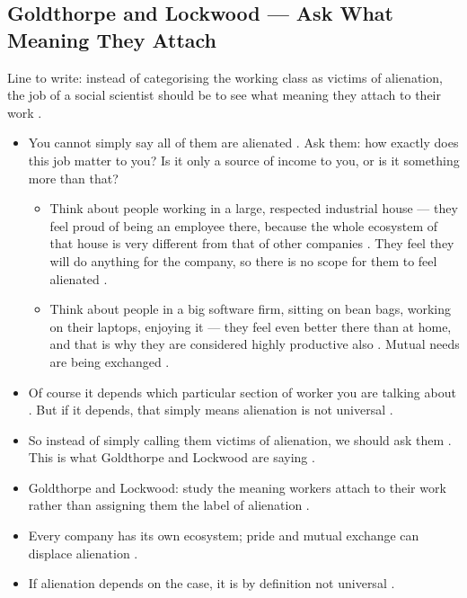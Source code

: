 \subsection{Goldthorpe and Lockwood --- Ask What Meaning They Attach}
\begin{KeyConcept}
Line to write: instead of categorising the working class as victims of alienation, the job of a social scientist should be to see what meaning they attach to their work .
\end{KeyConcept}

\begin{itemize}
    \item You cannot simply say all of them are alienated . Ask them: how exactly does this job matter to you? Is it only a source of income to you, or is it something more than that? 
    \begin{itemize}
        \item Think about people working in a large, respected industrial house --- they feel proud of being an employee there, because the whole ecosystem of that house is very different from that of other companies . They feel they will do anything for the company, so there is no scope for them to feel alienated .
        \item Think about people in a big software firm, sitting on bean bags, working on their laptops, enjoying it --- they feel even better there than at home, and that is why they are considered highly productive also . Mutual needs are being exchanged .
    \end{itemize}
    \item Of course it depends which particular section of worker you are talking about . But if it depends, that simply means alienation is not universal .
    \item So instead of simply calling them victims of alienation, we should ask them . This is what Goldthorpe and Lockwood are saying .
\end{itemize}

\begin{QuickRevision}
\begin{itemize}
    \item Goldthorpe and Lockwood: study the meaning workers attach to their work rather than assigning them the label of alienation .
    \item Every company has its own ecosystem; pride and mutual exchange can displace alienation .
    \item If alienation depends on the case, it is by definition not universal .
\end{itemize}
\end{QuickRevision}

